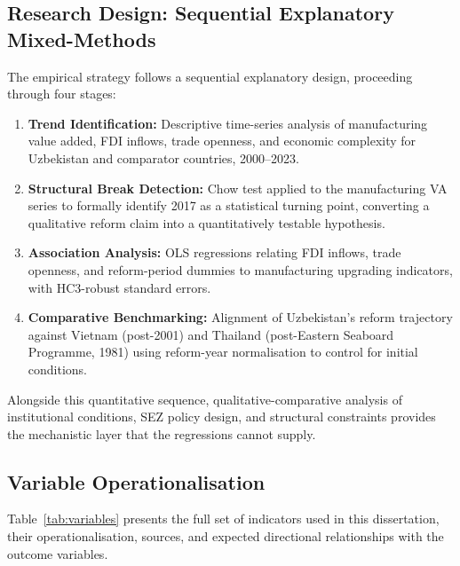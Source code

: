 \subsection{Research Design: Sequential Explanatory Mixed-Methods}

The empirical strategy follows a sequential explanatory design, proceeding through four stages:

\begin{enumerate}
 \item \textbf{Trend Identification:} Descriptive time-series analysis of manufacturing value added, FDI inflows, trade openness, and economic complexity for Uzbekistan and comparator countries, 2000--2023.
 \item \textbf{Structural Break Detection:} Chow test applied to the manufacturing VA series to formally identify 2017 as a statistical turning point, converting a qualitative reform claim into a quantitatively testable hypothesis.
 \item \textbf{Association Analysis:} OLS regressions relating FDI inflows, trade openness, and reform-period dummies to manufacturing upgrading indicators, with HC3-robust standard errors.
 \item \textbf{Comparative Benchmarking:} Alignment of Uzbekistan's reform trajectory against Vietnam (post-2001) and Thailand (post-Eastern Seaboard Programme, 1981) using reform-year normalisation to control for initial conditions.
\end{enumerate}

Alongside this quantitative sequence, qualitative-comparative analysis of institutional conditions, SEZ policy design, and structural constraints provides the mechanistic layer that the regressions cannot supply.

\subsection{Variable Operationalisation}

Table~\ref{tab:variables} presents the full set of indicators used in this dissertation, their operationalisation, sources, and expected directional relationships with the outcome variables.

